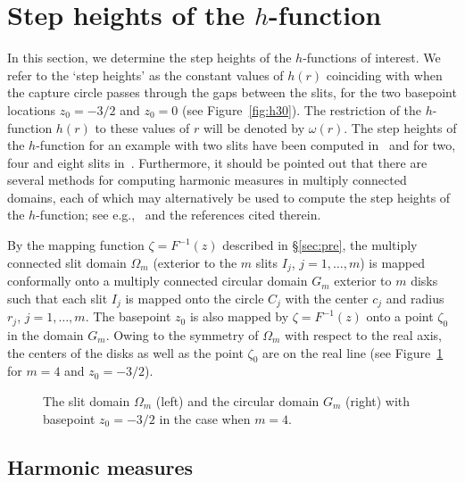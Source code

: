 \section{Step heights of the $h$-function}\label{sec:step}

In this section, we determine the step heights of the $h$-functions of interest. We refer to the `step heights' as the constant values of $h(r)$ coinciding with when the capture circle passes through the gaps between the slits, for the two basepoint locations $z_0=-3/2$ and $z_0=0$ (see Figure~\ref{fig:h30}). The restriction of the $h$-function $h(r)$ to these values of $r$ will be denoted by $\omega(r)$. The step heights of the $h$-function for an example with two slits have been computed in~\cite{SnipWard16} and for two, four and eight slits in~\cite{gswc}. Furthermore, it should be pointed out that there are several methods for computing harmonic measures in multiply connected domains, each of which may alternatively be used to compute the step heights of the $h$-function; see e.g.,~\cite{CrowdyBook,Del-harm,Tre-Gre,garmar,Tre-Ser} and the references cited therein.

By the mapping function $\zeta=F^{-1}(z)$ described in \S\ref{sec:pre}, the multiply connected slit domain $\Omega_m$ (exterior to the $m$ slits $I_j$, $j=1,\ldots,m$) is mapped conformally onto a multiply connected circular domain $G_m$ exterior to $m$ disks such that each slit $I_{j}$ is mapped onto the circle $C_j$ with the center $c_j$ and radius $r_j$, $j=1,\ldots,m$. The basepoint $z_0$ is also mapped by $\zeta=F^{-1}(z)$ onto a point $\zeta_0$ in the domain $G_m$.
Owing to the symmetry of $\Omega_m$ with respect to the real axis, the centers of the disks as well as the point $\zeta_0$ are on the real line (see Figure~\ref{fig:map} for $m=4$ and $z_0=-3/2$).  


\begin{figure}[ht] %
\centerline{\hfill
{}\hfill
{}\hfill
}
\caption{The slit domain $\Omega_m$ (left) and the circular domain $G_m$ (right) with basepoint $z_0=-3/2$ in the case when $m=4$.}
\label{fig:map}
\end{figure}






\subsection{Harmonic measures}

